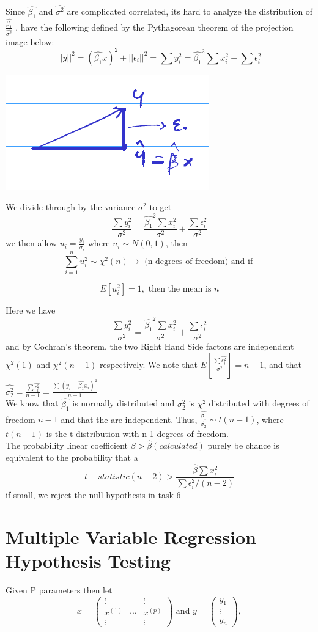 Since $\hat{\beta_1}$ and $\hat{\sigma^2}$ are complicated correlated, its hard to analyze the distribution of $\frac{\hat{\beta_1}}{\hat{\sigma^2}}$ . have the following defined by the Pythagorean theorem of the projection image below: 
\[
||y||^2 = (\hat{\beta_1}x)^2 + ||\epsilon_i||^2 = \sum y_i^2 = \hat{\beta_1}^2\sum x_i^2 + \sum \epsilon_i^2
\]
\begin{center}
    \includegraphics{Images/yHATProjection.png}
\end{center}

We divide through by  the variance $\sigma^2$ to get 
\[
\frac{\sum y_i^2}{\sigma^2} = \frac{\hat{\beta_1}^2\sum x_i^2}{\sigma^2} + \frac{\sum \epsilon_i^2}{\sigma^2}
\]
we then allow $u_i = \frac{ y_i}{\sigma_i}$ where $u_i \sim N(0,1)$, then
\[\sum_{i=1}^n u_i^2\sim \chi^2(n) \to \textrm{ (n degrees of freedom) and if }\]

\[ E[u_i^2]=1, \textrm{ then the mean is } n\]

Here we have 
\[
\frac{\sum y_i^2}{\sigma^2} = \frac{\hat{\beta_1}^2\sum x_i^2}{\sigma^2} + \frac{\sum \epsilon_i^2}{\sigma^2}
\]
and by Cochran's theorem, the two Right Hand Side factors are independent $\chi^2(1)$ and $ \chi^2(n-1)$ respectively. 
We note that $E[\frac{\sum \hat{\epsilon_i^2}}{\sigma^2}]= n-1$, and that $\hat{\sigma_2^2}= \frac{\sum \hat{\epsilon_i^2}}{n-1}  = \frac{\sum(y_i-\hat{\beta_1}x_i)^2}{n-1}$\\

We know that $\hat{\beta_1}$ is normally distributed and $\sigma_2^2$ is $\chi^2$ distributed with degrees of freedom $n-1$ and that the are independent. Thus, $\frac{\hat{\beta_1}}{\hat{\sigma_2}}\sim t(n-1)$, where $t(n-1)$ is the t-distribution with n-1 degrees of freedom.\\
The probability linear coefficient $\beta > \hat{\beta}(calculated)$ purely be chance is equivalent to the probability that a 
\[
t-statistic(n-2) > \frac{\hat{\beta }\sum x_i^2}{\sum \epsilon_i^2 / (n-2)}
\]
if small, we reject the null hypothesis in task 6
\section{Multiple Variable Regression Hypothesis Testing}
Given P parameters then let
$$x=\begin{pmatrix}
\vdots&&\vdots\\
x^{(1)}&\cdots&x^{(p)}\\
\vdots&&\vdots
\end{pmatrix}\text{ and } y=\begin{pmatrix}
y_1\\
\vdots\\
y_n
\end{pmatrix},$$

